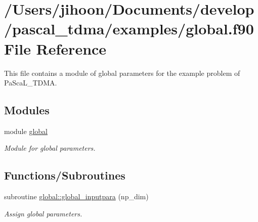 \hypertarget{global_8f90}{}\section{/\+Users/jihoon/\+Documents/develop/pascal\+\_\+tdma/examples/global.f90 File Reference}
\label{global_8f90}


This file contains a module of global parameters for the example problem of Pa\+Sca\+L\+\_\+\+T\+D\+MA.  


\subsection*{Modules}
\begin{DoxyCompactItemize}
\item 
module \mbox{\hyperlink{namespaceglobal}{global}}
\begin{DoxyCompactList}\small\item\em Module for global parameters. \end{DoxyCompactList}\end{DoxyCompactItemize}
\subsection*{Functions/\+Subroutines}
\begin{DoxyCompactItemize}
\item 
subroutine \mbox{\hyperlink{namespaceglobal_a930b565da2644b675f35b91735e11ce3}{global\+::global\+\_\+inputpara}} (np\+\_\+dim)
\begin{DoxyCompactList}\small\item\em Assign global parameters. \end{DoxyCompactList}\end{DoxyCompactItemize}

